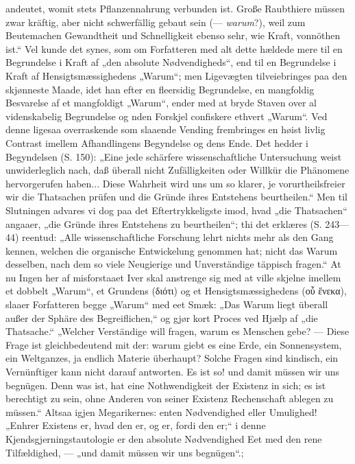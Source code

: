 \documentclass[12pt,a4paper]{book}
\begin{document}
{andeutet, womit stets Pflanzennahrung verbunden ist. Große Raubthiere
müssen zwar kräftig, aber nicht schwerfällig gebaut sein (---
\emph{warum}?), weil zum Beutemachen Gewandtheit und Schnelligkeit ebenso
sehr, wie Kraft, vonnöthen ist.“ Vel kunde det synes, som om Forfatteren
med alt dette hældede mere til en Begrundelse i Kraft af „den absolute
Nødvendigheds“, end til en Begrundelse i Kraft af Hensigtsmæssighedens
„Warum“; men Ligevægten tilveiebringes paa den skjønneste Maade, idet han
efter en fleersidig Begrundelse, en mangfoldig Besvarelse af et mangfoldigt
„Warum“, ender med at bryde Staven over al videnskabelig Begrundelse og
nden Forskjel confiskere ethvert „Warum“. Ved denne ligesaa overraskende
som slaaende Vending frembringes en høist livlig Contrast imellem
Afhandlingens Begyndelse og dens Ende. Det hedder i Begyndelsen (S. 150):
„Eine jede schärfere wissenschaftliche Untersuchung weist unwiderleglich
nach, daß überall nicht Zufälligkeiten oder Willkür die Phänomene
hervorgerufen haben... Diese Wahrheit wird uns um so klarer, je
vorurtheilsfreier wir die Thatsachen prüfen und die Gründe ihres
Entstehens beurtheilen.“ Men til Slutningen advares vi dog paa det
Eftertrykkeligste imod, hvad „die Thatsachen“ angaaer, „die Gründe ihres
Entstehens zu beurtheilen“; thi det erklæres (S. 243---44) reentud: „Alle
wissenschaftliche Forschung lehrt nichts mehr als den Gang kennen, welchen
die organische Entwickelung genommen hat; nicht das Warum desselben, nach
dem so viele Neugierige und Unverständige täppisch fragen.“ At nu Ingen
her af misforstaaet Iver skal anstrenge sig med at ville skjelne imellem
et dobbelt „Warum“, et Grundens (διότι) og et Hensigtsmæssighedens
(οὗ ἕνεκα), slaaer Forfatteren begge „Warum“ med eet Smæk: „Das Warum
liegt überall außer der Sphäre des Begreiflichen,“ og gjør kort Proces ved
Hjælp af „die Thatsache.“ „Welcher Verständige will fragen, warum es
Menschen gebe? --- Diese Frage ist gleichbedeutend mit der: warum giebt es
eine Erde, ein Sonnensystem, ein Weltganzes, ja endlich Materie überhaupt?
Solche Fragen sind kindisch, ein Vernünftiger kann nicht darauf antworten.
Es ist so! und damit müssen wir uns begnügen. Denn was ist, hat eine
Nothwendigkeit der Existenz in sich; es ist berechtigt zu sein, ohne
Anderen von seiner Existenz Rechenschaft ablegen zu müssen.“ Altsaa igjen
Megarikernes: enten Nødvendighed eller Umulighed! „Enhrer Existens er,
hvad den er, og er, fordi den er;“ i denne Kjendsgjerningstautologie er
den absolute Nødvendighed Eet med den rene Tilfældighed, --- „und damit
müssen wir uns begnügen“.};
\end{document}
